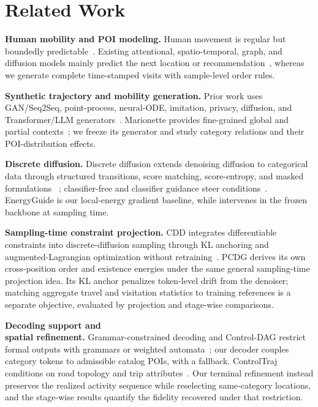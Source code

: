 \section{Related Work}
\label{sec:related}

\noindent\textbf{Human mobility and POI modeling.}
Human movement is regular but boundedly predictable~\cite{gonzalez2008mobility,song2010predictability}.
Existing attentional, spatio-temporal, graph, and diffusion models mainly
predict the next location or recommendation~\cite{feng2018deepmove,luo2021stan,yang2022getnext,long2024cloudedge,wang2024dsdrec,chen2025sequentialdiffusion,qin2023diffpoi,wang2025gnprsid},
whereas we generate complete time-stamped visits with sample-level order rules.

\noindent\textbf{Synthetic trajectory and mobility generation.}
Prior work uses GAN/Seq2Seq, point-process, neural-ODE, imitation, privacy,
diffusion, and Transformer/LLM generators~\cite{cao2021trajgen,jiang2023tstrajgen,xiong2024trajsgan,lin2023mbpgail,yuan2022activity,long2023synthetic,feng2020simulate,wang2023pategail,sun2023sprt,rao2023cats,hu2024retrasyn,netzler2024privacy,zhu2023difftraj,yuan2023stdpp,gong2025stcdm,chen2024trajgdm,wei2024diffrntraj,rao2025seed,long2026population,zhang2024mobglm,hsu2024trajgpt,li2025geollama,haydari2026mobilitygpt}.
Marionette provides fine-grained global and partial contexts~\cite{deng2025marionette};
we freeze its generator and study category relations and their POI-distribution effects.

\noindent\textbf{Discrete diffusion.}
Discrete diffusion extends denoising diffusion to categorical data through
structured transitions, score matching, score-entropy, and masked formulations
~\cite{ho2020ddpm,austin2021d3pm,meng2022concrete,lou2024sedd,sahoo2024mdlm};
classifier-free and classifier guidance steer conditions~\cite{schiff2025guidance}.
EnergyGuide is our local-energy gradient baseline, while \pcdg intervenes in
the frozen backbone at sampling time.

\noindent\textbf{Sampling-time constraint projection.}
CDD integrates differentiable constraints into discrete-diffusion sampling
through KL anchoring and augmented-Lagrangian optimization without
retraining~\cite{cardei2025cdd}. PCDG derives its own cross-position order and
existence energies under the same general sampling-time projection idea. Its KL
anchor penalizes token-level drift from the denoiser; matching aggregate travel
and visitation statistics to training references is a separate objective,
evaluated by projection and stage-wise comparisons.

\noindent\textbf{Decoding support and\\[-1pt] spatial refinement.}
Grammar-constrained decoding and Control-DAG restrict formal outputs with
grammars or weighted automata~\cite{geng2023grammar,chen2024controldag}; our
decoder couples category tokens to admissible catalog POIs, with a fallback.
ControlTraj conditions on road topology and trip attributes~\cite{zhu2024controltraj}.
Our terminal refinement instead preserves the realized activity sequence while
reselecting same-category locations, and the stage-wise results quantify the
fidelity recovered under that restriction.

